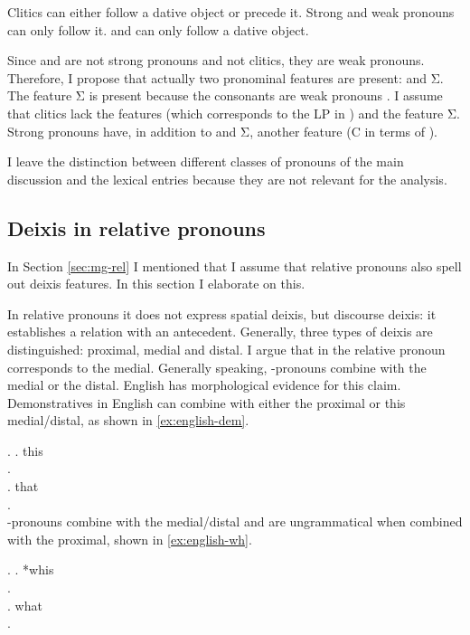 Clitics can either follow a dative object or precede it. Strong and weak pronouns can only follow it.  and  can only follow a dative object.

Since  and  are not strong pronouns and not clitics, they are weak pronouns.
Therefore, I propose that actually two pronominal features are present:  and Σ. The feature Σ is present because the consonants are weak pronouns \citep{cardinaletti1994}.
I assume that clitics lack the features  (which corresponds to the LP in ) and the feature Σ. Strong pronouns have, in addition to  and Σ, another feature (C in terms of ).

I leave the distinction between different classes of pronouns of the main discussion and the lexical entries because they are not relevant for the analysis.


\subsection{Deixis in relative pronouns}\label{sec:deixis-rp}

In Section \ref{sec:mg-rel} I mentioned that I assume that relative pronouns also spell out deixis features. In this section I elaborate on this.

In relative pronouns it does not express spatial deixis, but discourse deixis: it establishes a relation with an antecedent.
Generally, three types of deixis are distinguished: proximal, medial and distal. I argue that  in the relative pronoun corresponds to the medial. Generally speaking, -pronouns combine with the medial or the distal. English has morphological evidence for this claim. Demonstratives in English can combine with either the proximal or this medial/distal, as shown in \ref{ex:english-dem}.

\ex.\label{ex:english-dem}
 \ag. this\\
 .\\
 \bg. that\\
 .\\

-pronouns combine with the medial/distal and are ungrammatical when combined with the proximal, shown in \ref{ex:english-wh}.

\ex.\label{ex:english-wh}
 \ag. *whis\\
 .\\
 \bg. what\\
 .\\

